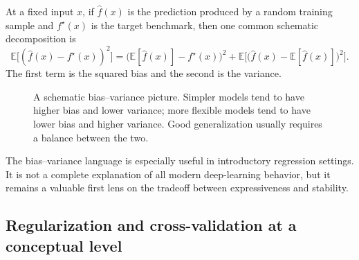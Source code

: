At a fixed input $x$, if $\hat f(x)$ is the prediction produced by a random training sample and $f^\star(x)$ is the target benchmark, then one common schematic decomposition is
\[
\mathbb E\big[(\hat f(x)-f^\star(x))^2\big]
=
\big(\mathbb E[\hat f(x)]-f^\star(x)\big)^2
+
\mathbb E\Big[\big(\hat f(x)-\mathbb E[\hat f(x)]\big)^2\Big].
\]
The first term is the squared bias and the second is the variance.

\begin{figure}[tbp]
\centering
{}
\caption{A schematic bias--variance picture. Simpler models tend to have higher bias and lower variance; more flexible models tend to have lower bias and higher variance. Good generalization usually requires a balance between the two.}
\end{figure}

The bias--variance language is especially useful in introductory regression settings. It is not a complete explanation of all modern deep-learning behavior, but it remains a valuable first lens on the tradeoff between expressiveness and stability.

\subsection*{Regularization and cross-validation at a conceptual level}

